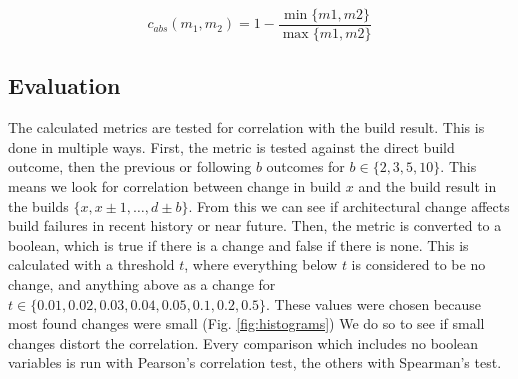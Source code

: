 \documentclass[conference]{IEEEtran}
\begin{document}
\begin{equation} \label{eq:absDiff}
	c_{abs}(m_1, m_2) = 1 - \frac{\min\{m1, m2\}}{\max\{m1, m2\}}
\end{equation} 

\subsection{Evaluation}

The calculated metrics are tested for correlation with the build result. This is done in multiple ways. First, the metric is tested against the direct build outcome, then the previous or following $b$ outcomes for $b \in \{2, 3, 5, 10\}$. This means we look for correlation between change in build $x$ and the build result in the builds $\{x, x \pm 1, \hdots, d \pm b\}$. From this we can see if architectural change affects build failures in recent history or near future. 
Then, the metric is converted to a boolean, which is true if there is a change and false if there is none. This is calculated with a threshold $t$, where everything below $t$ is considered to be no change, and anything above as a change for $t \in \{0.01, 0.02, 0.03, 0.04, 0.05, 0.1, 0.2, 0.5\}$. These values were chosen because most found changes were small (Fig. \ref{fig:histograms}) We do so to see if small changes distort the correlation. Every comparison which includes no boolean variables is run with Pearson's correlation test, the others with Spearman's test. 
\end{document}
